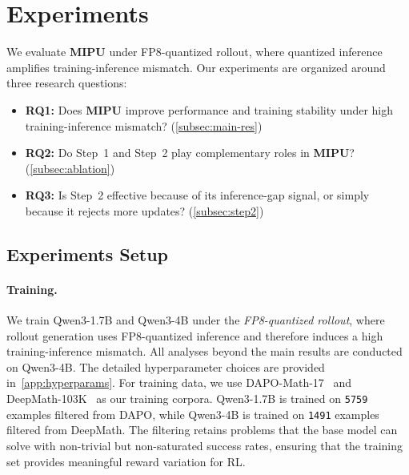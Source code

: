 
\section{Experiments}
\label{sec:experiments}

We evaluate \textbf{MIPU} under FP8-quantized rollout, where quantized inference amplifies training-inference mismatch.
Our experiments are organized around three research questions:

\begin{itemize}
    \item \textbf{RQ1:} Does \textbf{MIPU} improve performance and training stability under high training-inference mismatch? 
    (\autoref{subsec:main-res})
    \item \textbf{RQ2:} Do Step~1 and Step~2 play complementary roles in \textbf{MIPU}? 
    (\autoref{subsec:ablation})
    \item \textbf{RQ3:} Is Step~2 effective because of its inference-gap signal, or simply because it rejects more updates? 
    (\autoref{subsec:step2})
\end{itemize}

\subsection{Experiments Setup}

\paragraph{Training.}
We train Qwen3-1.7B and Qwen3-4B under the \emph{FP8-quantized rollout}, where rollout generation uses FP8-quantized inference and therefore induces a high training-inference mismatch.
All analyses beyond the main results are conducted on Qwen3-4B.
The detailed hyperparameter choices are provided in~\autoref{app:hyperparams}.
For training data, we use 
DAPO-Math-17~\citep{Yu2025DAPO} and 
DeepMath-103K~\citep{deepmath} as our training corpora.
Qwen3-1.7B is trained on \texttt{5759} examples filtered from DAPO, while Qwen3-4B is trained on \texttt{1491} examples filtered from DeepMath.
The filtering retains problems that the base model can solve with non-trivial but non-saturated success rates, ensuring that the training set provides meaningful reward variation for RL.

